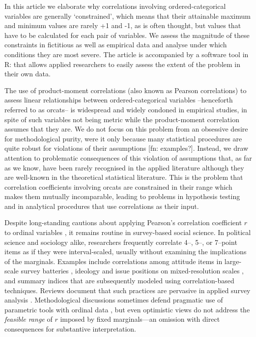 \documentclass[
  12pt,
]{article}
\theoremstyle{plain}
\theoremstyle{definition}
\theoremstyle{remark}
\begin{document}
In this article we elaborate why correlations involving
ordered-categorical variables are generally `constrained', which means
that their attainable maximum and minimum values are rarely +1 and -1,
as is often thought, but values that have to be calculated for each pair
of variables. We assess the magnitude of these constraints in fictitious
as well as empirical data and analyse under which conditions they are
most severe. The article is accompanied by a software tool in R: that
allows applied researchers to easily assess the extent of the problem in
their own data.

The use of product-moment correlations (also known as Pearson
correlations) to assess linear relationships between ordered-categorical
variables --henceforth referred to as orcats-- is widespread and widely
condoned in empirical studies, in spite of such variables not being
metric while the product-moment correlation assumes that they are. We do
not focus on this problem from an obsessive desire for methodological
purity, were it only because many statistical procedures are quite
robust for violations of their assumptions {[}fn: examples?{]}. Instead,
we draw attention to problematic consequences of this violation of
assumptions that, as far as we know, have been rarely recognised in the
applied literature although they are well-known in the theoretical
statistical literature. This is the problem that correlation
coefficients involving orcats are constrained in their range which makes
them mutually incomparable, leading to problems in hypothesis testing
and in analytical procedures that use correlations as their input.

Despite long-standing cautions about applying Pearson's correlation
coefficient \(r\) to ordinal variables
\autocite{labo70-assignment,gait80-measurement}, it remains routine in
survey-based social science. In political science and sociology alike,
researchers frequently correlate 4--, 5--, or 7--point items as if they
were interval-scaled, usually without examining the implications of the
marginals. Examples include correlations among attitude items in
large-scale survey batteries \autocite{alwi91-reliability}, ideology and
issue positions on mixed-resolution scales
\autocite{brew05-values,kind09-us}, and summary indices that are
subsequently modeled using correlation-based techniques. Reviews
document that such practices are pervasive in applied survey analysis
\autocite{kreu07-survey}. Methodological discussions sometimes defend
pragmatic use of parametric tools with ordinal data
\autocite{jaco99-levels}, but even optimistic views do not address the
\emph{feasible range} of \(r\) imposed by fixed marginals---an omission
with direct consequences for substantive interpretation.
\end{document}

